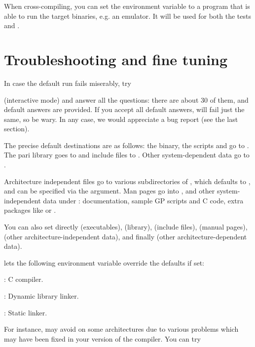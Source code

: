 
When cross-compiling, you can set the environment variable  to a
program that is able to run the target binaries, e.g. an emulator. It will be
used for both the  tests and .

\section{Troubleshooting and fine tuning}
In case the default  run fails miserably, try


\noindent (interactive mode) and answer all the questions: there are about 30
of them, and default answers are provided. If you accept all default answers,
 will fail just the same, so be wary. In any case, we would
appreciate a bug report (see the last section).

 The precise default destinations are as
follows: the  binary, the scripts  and  go
to . The pari library goes to  and
include files to . Other system-dependent data go
to .

Architecture independent files go to various subdirectories of
, which defaults to , and can be
specified via the  argument. Man pages go into
, and other system-independent data
under : documentation,
sample GP scripts and C code, extra packages like  or
.

\noindent You can also set directly  (executables),
 (library),  (include files), 
(manual pages),  (other architecture-independent data), and
finally  (other architecture-dependent data).

  lets the following environment
variable override the defaults if set:

: C compiler.

: Dynamic library linker.

: Static linker.

\noindent For instance,  may avoid  on some
architectures due to various problems which may have been fixed in your
version of the compiler. You can try


